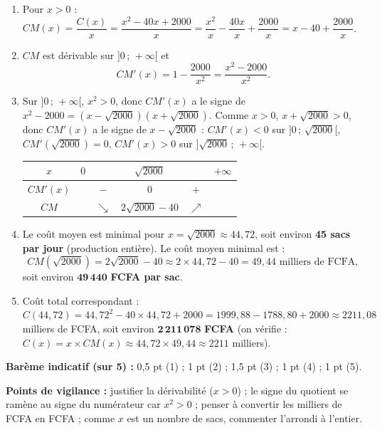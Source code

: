 \documentclass[11pt]{article}
\begin{document}
\begin{corrige}
\begin{enumerate}
\item Pour $x>0$ : $CM(x)=\dfrac{C(x)}{x}=\dfrac{x^2-40x+2000}{x}=\dfrac{x^2}{x}-\dfrac{40x}{x}+\dfrac{2000}{x}=x-40+\dfrac{2000}{x}$.
\item $CM$ est dérivable sur $]0\,;\,+\infty[$ et
\[ CM'(x)=1-\dfrac{2000}{x^2}=\dfrac{x^2-2000}{x^2}. \]
\item Sur $]0\,;\,+\infty[$, $x^2>0$, donc $CM'(x)$ a le signe de $x^2-2000=(x-\sqrt{2000})(x+\sqrt{2000})$. Comme $x>0$, $x+\sqrt{2000}>0$, donc $CM'(x)$ a le signe de $x-\sqrt{2000}$ : $CM'(x)<0$ sur $]0\,;\,\sqrt{2000}[$, $CM'(\sqrt{2000})=0$, $CM'(x)>0$ sur $]\sqrt{2000}\,;\,+\infty[$.

\begin{center}
\begin{tabular}{|c|ccccc|}\hline
$x$ & $0$ & & $\sqrt{2000}$ & & $+\infty$ \\ \hline
$CM'(x)$ & & $-$ & $0$ & $+$ & \\ \hline
$CM$ & & $\searrow$ & $2\sqrt{2000}-40$ & $\nearrow$ & \\ \hline
\end{tabular}
\end{center}
\item Le coût moyen est minimal pour $x=\sqrt{2000}\approx 44{,}72$, soit environ \textbf{45 sacs par jour} (production entière). Le coût moyen minimal est :
\[ CM(\sqrt{2000})=2\sqrt{2000}-40\approx 2\times 44{,}72-40=49{,}44 \text{ milliers de FCFA}, \]
soit environ $\mathbf{49\,440}$ \textbf{FCFA par sac}.
\item Coût total correspondant : $C(44{,}72)=44{,}72^2-40\times 44{,}72+2000=1999{,}88-1788{,}80+2000\approx 2211{,}08$ milliers de FCFA, soit environ $\mathbf{2\,211\,078}$ \textbf{FCFA} (on vérifie : $C(x)=x\times CM(x)\approx 44{,}72\times 49{,}44\approx 2211$ milliers).
\end{enumerate}
\textbf{Barème indicatif (sur 5) :} 0,5 pt (1) ; 1 pt (2) ; 1,5 pt (3) ; 1 pt (4) ; 1 pt (5).

\textbf{Points de vigilance :} justifier la dérivabilité ($x>0$) ; le signe du quotient se ramène au signe du numérateur car $x^2>0$ ; penser à convertir les milliers de FCFA en FCFA ; comme $x$ est un nombre de sacs, commenter l'arrondi à l'entier.
\end{corrige}
\end{document}
